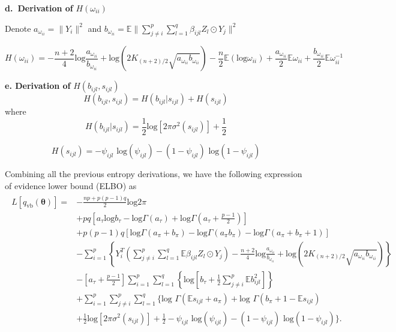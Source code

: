 \documentclass[
]{book}
\begin{document}
\textbf{d.~Derivation of} \(H(\omega_{ii})\)

Denote \(a_{\omega_{ii}} = \|Y_i\|^2\) and \(b_{\omega_{ii}} = \mathbb{E}\|\sum_{j \neq i}^p \sum_{l=1}^q \beta_{ijl} Z_l \odot Y_j\|^2\)

\[H(\omega_{ii}) = -\frac{n+2}{4} \text{log}\frac{a_{\omega_{ii}}}{b_{\omega_{ii}}} + \text{log}(2K_{(n+2)/2}\sqrt{a_{\omega_{ii}} b_{\omega_{ii}}}) -\frac{n}{2}\mathbb{E}(\text{log}\omega_{ii})+ \frac{a_{\omega_{ii}}}{2}\mathbb{E}\omega_{ii} + \frac{b_{\omega_{ii}}}{2}\mathbb{E}\omega_{ii}^{-1}\]

\textbf{e. Derivation of} \(H(b_{ijl}, s_{ijl})\)
\[H(b_{ijl}, s_{ijl}) = H(b_{ijl}|s_{ijl}) + H(s_{ijl})\]
where
\[H(b_{ijl}|s_{ijl}) = \frac{1}{2} \text{log} \left[2\pi\sigma^2(s_{ijl})\right] + \frac{1}{2}\]

\[H(s_{ijl}) = -\psi_{ijl} \text{ log}(\psi_{ijl}) - (1-\psi_{ijl}) \text{ log}(1-\psi_{ijl})\]

Combining all the previous entropy derivations, we have the following expression of evidence lower bound (ELBO) as
\begin{align*}
\begin{split}
L[q_{\text{vb}}(\boldsymbol{\theta})] =
& -\frac{np + p(p-1)q}{2} \text{log} 2\pi \\
& + p q \left[
a_\tau \text{log}b_\tau -  \text{log} \Gamma(a_\tau)
+ \text{log} \Gamma(a_\tau + \frac{p-1}{2})
\right] 
\\
& + p(p-1)q \left[
 \text{log} \Gamma(a_\pi + b_\pi)
 -\text{log} \Gamma(a_\pi b_\pi)
 -\text{log} \Gamma(a_\pi+b_\pi+1)
\right] \\
& - \sum_{i=1}^p 
\left\{
Y_i^T \left(
\sum_{j \neq i}^p \sum_{l=1}^q \mathbb{E} \beta_{ijl} Z_l \odot Y_j
\right)
- \frac{n+2}{4} \text{log}\frac{a_{\omega_{ii}}}{b_{\omega_{ii}}} + \text{log}(2K_{(n+2)/2}\sqrt{a_{\omega_{ii}} b_{\omega_{ii}}})
\right\} \\
&- \left[a_\tau+\frac{p-1}{2}\right] 
\sum_{i=1}^p \sum_{l=1}^q 
\left\{
\text{log}\left[b_\tau + \frac{1}{2}\sum_{j \neq i} ^p\mathbb{E}b_{ijl}^2\right]
\right \} \\
&+ \sum_{i=1}^p \sum_{j \neq i}^p \sum_{l=1}^q \biggl \{ 
\text{log }
\Gamma(\mathbb{E}s_{ijl} + a_\pi) + \text{log }
\Gamma(b_\pi + 1 - \mathbb{E}s_{ijl}) \\
&+ \frac{1}{2} \text{log} \left[2\pi\sigma^2(s_{ijl})\right] + \frac{1}{2} -\psi_{ijl} \text{ log}(\psi_{ijl}) - (1-\psi_{ijl}) \text{ log}(1-\psi_{ijl})
\biggl \}.
\end{split}
\end{align*}
\end{document}
